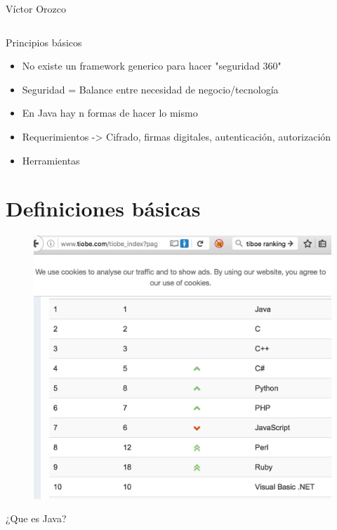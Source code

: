 \documentclass{beamer}
\begin{document}
\begin{frame}{Víctor Orozco}
\begin{columns}[T]
\begin{column}[T]{4cm}
        \end{column}
    \end{columns}
\end{frame}

\begin{frame}{Principios básicos}
	\begin{itemize}
	\item No existe un framework generico para hacer "seguridad 360"
	\item Seguridad = Balance entre necesidad de negocio/tecnología
	\item En Java hay n formas de hacer lo mismo
	\item Requerimientos -> Cifrado, firmas digitales, autenticación, autorización
	\item Herramientas
\end{itemize}
\end{frame}


\section{\faBars  Definiciones básicas}

\begin{frame}
	\begin{figure}
		\centering
		\includegraphics[width=0.9\linewidth]{Images/tiboe}
	\end{figure}
\end{frame}

\begin{frame}
	\huge ¿Que es Java?
\end{frame}
\end{document}
